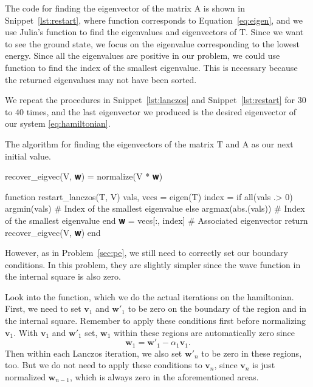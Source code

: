 The code for finding the eigenvector of the matrix $\mathrm{A}$ is shown in
Snippet~\ref{lst:restart}, where function  corresponds to
Equation~\eqref{eq:eigen}, and we use Julia's  function to find the eigenvalues
and eigenvectors of $\mathrm{T}$. Since we want to see the ground state, we focus on the
eigenvalue corresponding to the lowest energy. Since all the eigenvalues are positive in our
problem, we could use function  to find the index of the smallest eigenvalue.
This is necessary because the returned eigenvalues may not have been sorted.

We repeat the procedures in Snippet~\ref{lst:lanczos} and Snippet~\ref{lst:restart}
for $30$ to $40$ times, and the last eigenvector we produced is the desired eigenvector
of our system \eqref{eq:hamiltonian}.

\begin{algorithm}[!hbt]
    \caption{The algorithm for finding the eigenvectors of the matrix $\mathrm{T}$
        and $\mathrm{A}$ as our next initial value.}
    \label{lst:restart}
    \begin{juliacode}
recover_eigvec(V, 𝐰) = normalize(V * 𝐰)

function restart_lanczos(T, V)
    vals, vecs = eigen(T)
    index = if all(vals .> 0)
        argmin(vals)  # Index of the smallest eigenvalue
    else
        argmax(abs.(vals))  # Index of the smallest eigenvalue
    end
    𝐰 = vecs[:, index]  # Associated eigenvector
    return recover_eigvec(V, 𝐰)
end
    \end{juliacode}
\end{algorithm}

However, as in Problem~\ref{sec:pe}, we still need to correctly set our boundary
conditions. In this problem, they are slightly simpler since the wave function
in the internal square is also zero.

Look into the  function, which we do the actual iterations on
the hamiltonian.
First, we need to set $\bm{v}_1$ and $\bm{w}'_1$ to be zero on the boundary of the region
and in the internal square. Remember to apply these conditions first before
normalizing $\bm{v}_1$. With $\bm{v}_1$ and $\bm{w}'_1$ set, $\bm{w}_1$ within these
regions are automatically zero since
%
\begin{equation}
    \bm{w}_1 = \bm{w}'_1 - \alpha_1 \bm{v}_1.
\end{equation}
%
Then within each Lanczos iteration, we also set $\bm{w}'_n$ to be zero in these regions,
too. But we do not need to apply these conditions to $\bm{v}_n$,
since $\bm{v}_n$ is just normalized $\bm{w}_{n-1}$, which is always zero
in the aforementioned areas.

